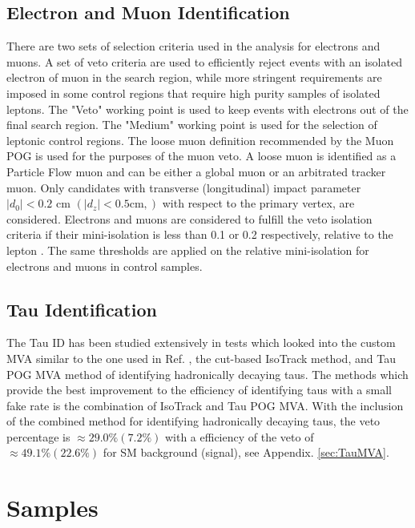  \subsection{Electron and Muon Identification}\label{EleMuonID}
 There are two sets of selection criteria used in the analysis for electrons and muons. A set of veto criteria are used to efficiently reject events with an isolated electron of muon in the search region, while more stringent requirements are imposed in some control regions that require high purity samples of isolated leptons. The "Veto" working point is used to keep events with electrons out of the final search region. The "Medium" working point is used for the selection of leptonic control regions. The loose muon definition recommended by the Muon POG is used for the purposes of the muon veto. A loose muon is identified as a Particle Flow\cite{noauthor_cms_nodate} muon and can be either a global muon or an arbitrated tracker muon. Only candidates with transverse (longitudinal) impact parameter $|d_0|<0.2$ cm $(|d_z|<0.5 \text{cm},)$ with respect to the primary vertex, are considered. Electrons and muons are considered to fulfill the veto isolation criteria if their mini-isolation is less than 0.1 or 0.2 respectively, relative to the lepton \pt. The same thresholds are applied on the relative mini-isolation for electrons and muons in control samples. 
 
\subsection{Tau Identification}\label{TauID}
The Tau ID has been studied extensively in tests which looked into the custom MVA \cite{roe_boosted_2004, hoecker_tmva_2007} similar to the one used in Ref. \cite{noauthor_search_nodate}, the cut-based IsoTrack method, and Tau POG MVA method of identifying hadronically decaying taus. The methods which provide the best improvement to the efficiency of identifying taus with a small fake rate is the combination of IsoTrack and Tau POG MVA. With the inclusion of the combined method for identifying hadronically decaying taus, the veto percentage is $\approx29.0\%(7.2\%)$ with a efficiency of the veto of $\approx49.1\%(22.6\%)$ for SM background (signal), see Appendix. \ref{sec:TauMVA}. 

\section{Samples}\label{Samples}



